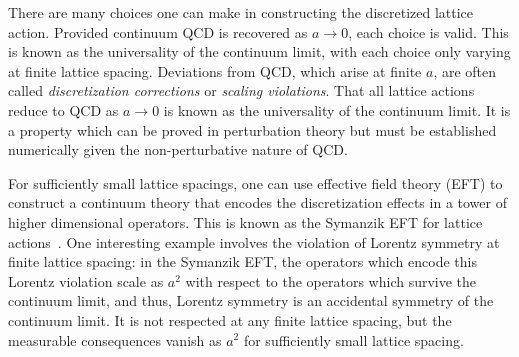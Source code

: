 There are many choices one can make in constructing the discretized lattice action.
Provided continuum QCD is recovered as $a\rightarrow0$, each choice is valid.
This is known as the universality of the continuum limit, with each choice only varying at finite lattice spacing.
Deviations from QCD, which arise at finite $a$, are often called \textit{discretization corrections} or \textit{scaling violations}.
That all lattice actions reduce to QCD as $a\rightarrow0$ is known as the universality of the continuum limit.  It is a property which can be proved in perturbation theory but must be established numerically given the non-perturbative nature of QCD.%
\begin{marginnote}
\end{marginnote}%
For sufficiently small lattice spacings, one can use effective field theory (EFT) to construct a continuum theory that encodes the discretization effects in a tower of higher dimensional operators. This is known as the Symanzik EFT for lattice actions~\cite{Symanzik:1983dc,Symanzik:1983gh}.
One interesting example involves the violation of Lorentz symmetry at finite lattice spacing: in the Symanzik EFT, the operators which encode this Lorentz violation scale as $a^2$ with respect to the operators which survive the continuum limit, and thus, Lorentz symmetry is an accidental symmetry of the continuum limit.  It is not respected at any finite lattice spacing, but the measurable consequences vanish as $a^2$ for sufficiently small lattice spacing.


